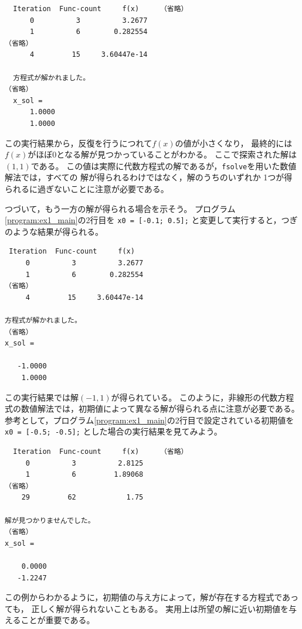 \documentclass[tombow,dvipdfmx]{corona-a5-1.1}
\begin{document}
\begin{例}[代数方程式の解の探索]
\smallskip
\begin{実行結果}
\begin{verbatim}
  Iteration  Func-count     f(x)     （省略）
      0          3          3.2677
      1          6        0.282554
（省略）
      4         15     3.60447e-14

  方程式が解かれました。
（省略）
  x_sol =
      1.0000
      1.0000
\end{verbatim}
\end{実行結果}

この実行結果から，反復を行うにつれて$f(x)$の値が小さくなり，
最終的には$f(x)$がほぼ0となる解が見つかっていることがわかる。
ここで探索された解は$(1, 1)$である。
この値は実際に代数方程式の解であるが，\verb|fsolve|を用いた数値解法では，すべての
解が得られるわけではなく，解のうちのいずれか
1つが得られるに過ぎないことに注意が必要である。

つづいて，もう一方の解が得られる場合を示そう。
プログラム\nobreak\ref{program:ex1_main}の2行目を
\verb|x0 = [-0.1; 0.5];|
と変更して実行すると，つぎのような結果が得られる。
\smallskip
\begin{実行結果}
\begin{verbatim}
 Iteration  Func-count     f(x)   
     0          3          3.2677
     1          6        0.282554
（省略）
     4         15     3.60447e-14

方程式が解かれました。
（省略）
x_sol =

   -1.0000
    1.0000
\end{verbatim}
\end{実行結果}

この実行結果では解$(-1, 1)$が得られている。
このように，非線形の代数方程式の数値解法では，初期値によって異なる解が得られる点に注意が必要である。
参考として，プログラム\nobreak\ref{program:ex1_main}の2行目で設定されている初期値を
\verb|x0 = [-0.5; -0.5];|
とした場合の実行結果を見てみよう。

\smallskip
\begin{実行結果}
    \begin{verbatim}
  Iteration  Func-count     f(x)     （省略）
     0          3          2.8125
     1          6         1.89068
（省略）
    29         62            1.75

解が見つかりませんでした。
（省略）
x_sol =

    0.0000
   -1.2247
\end{verbatim}
\end{実行結果}

この例からわかるように，初期値の与え方によって，解が存在する方程式であっても，
正しく解が得られないこともある。
実用上は所望の解に近い初期値を与えることが重要である。
\end{例}
\end{document}
